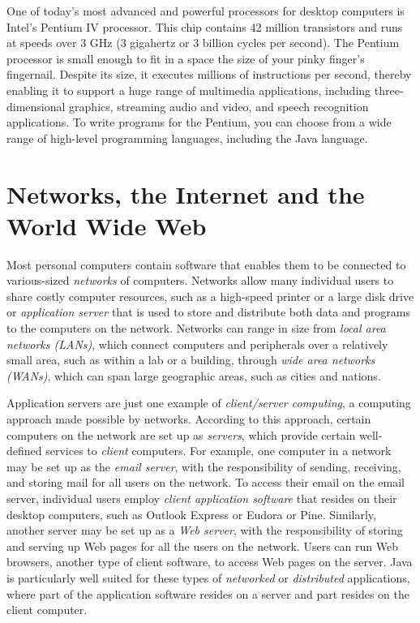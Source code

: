 One of today's most advanced and powerful processors for desktop
computers is Intel's Pentium IV processor.  This chip contains 42
million transistors and runs at speeds over 3 GHz (3 gigahertz or 3
billion cycles per second). The Pentium processor is small enough to
fit in a space the size of your pinky finger's fingernail. Despite its
size, it executes millions of instructions per second, thereby
enabling it to support a huge range of multimedia applications,
including three-dimensional graphics, streaming audio and video, and
speech recognition applications.  To write programs for the Pentium,
you can choose from a wide range of high-level programming languages,
including the Java language.

\section{Networks, the Internet and the World Wide Web}
\label{networksthe-internetandthe-world-wide-web}
\noindent Most personal computers contain software that enables them to be
connected to various-sized {\it networks} of
computers.  Networks allow many individual users to share costly
computer resources, such as a high-speed printer or a large disk drive
or {\it application server} that is used to store and distribute both
data and programs to the computers on the network. Networks can range
in size from {\it local area networks (LANs)}, which connect computers
and peripherals over a relatively small area, such as within a lab or
a building, through {\it wide area networks (WANs)}, which can span
large geographic areas, such as cities and nations.


Application servers are just one example of {\it client/server
computing}, a computing approach made possible by
networks.  According to this approach, certain computers on the
network are set up as {\it servers}, which provide certain
well-defined services to {\it client} computers.  For example, one
computer in a network may be set up as the {\it email server}, with
the responsibility of sending, receiving, and storing mail for all
users on the network.  To access their email on the email server,
individual users employ {\em client application software} that resides
on their desktop computers, such as Outlook Express or Eudora or Pine.
Similarly, another server may be set up as a {\it Web server}, with
the responsibility of storing and serving up Web pages for all the
users on the network.  Users can run Web browsers, another type of
client software, to access Web pages on the server.  Java is
particularly well suited for these types of {\em networked} or {\em
distributed} applications, where part of the application software
resides on a server and part resides on the client computer.


